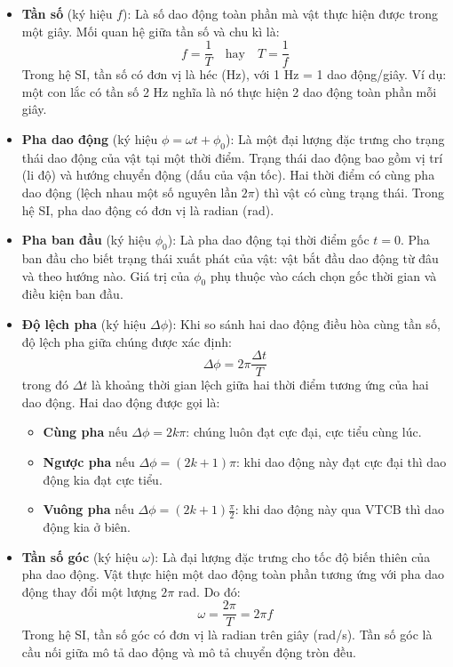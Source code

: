 \begin{enumerate}[label=\alph*)]
\begin{itemize}
        \item \textbf{Tần số} (ký hiệu $f$): Là số dao động toàn phần mà vật thực hiện được trong một giây. Mối quan hệ giữa tần số và chu kì là:
        \[
            f = \dfrac{1}{T} \quad \text{hay} \quad T = \dfrac{1}{f}
        \]
        Trong hệ SI, tần số có đơn vị là héc (Hz), với 1 Hz = 1 dao động/giây. Ví dụ: một con lắc có tần số 2 Hz nghĩa là nó thực hiện 2 dao động toàn phần mỗi giây.
        
        \item \textbf{Pha dao động} (ký hiệu $\phi = \omega t + \phi_0$): Là một đại lượng đặc trưng cho trạng thái dao động của vật tại một thời điểm. Trạng thái dao động bao gồm vị trí (li độ) và hướng chuyển động (dấu của vận tốc). Hai thời điểm có cùng pha dao động (lệch nhau một số nguyên lần $2\pi$) thì vật có cùng trạng thái. Trong hệ SI, pha dao động có đơn vị là radian (rad).
        
        \item \textbf{Pha ban đầu} (ký hiệu $\phi_0$): Là pha dao động tại thời điểm gốc $t = 0$. Pha ban đầu cho biết trạng thái xuất phát của vật: vật bắt đầu dao động từ đâu và theo hướng nào. Giá trị của $\phi_0$ phụ thuộc vào cách chọn gốc thời gian và điều kiện ban đầu.
        
        \item \textbf{Độ lệch pha} (ký hiệu $\Delta\phi$): Khi so sánh hai dao động điều hòa cùng tần số, độ lệch pha giữa chúng được xác định:
        \[
            \Delta \phi = 2\pi \dfrac{\Delta t}{T}
        \]
        trong đó $\Delta t$ là khoảng thời gian lệch giữa hai thời điểm tương ứng của hai dao động. Hai dao động được gọi là:
        \begin{itemize}
            \item \textbf{Cùng pha} nếu $\Delta\phi = 2k\pi$: chúng luôn đạt cực đại, cực tiểu cùng lúc.
            \item \textbf{Ngược pha} nếu $\Delta\phi = (2k+1)\pi$: khi dao động này đạt cực đại thì dao động kia đạt cực tiểu.
            \item \textbf{Vuông pha} nếu $\Delta\phi = (2k+1)\frac{\pi}{2}$: khi dao động này qua VTCB thì dao động kia ở biên.
        \end{itemize}
        
        \item \textbf{Tần số góc} (ký hiệu $\omega$): Là đại lượng đặc trưng cho tốc độ biến thiên của pha dao động. Vật thực hiện một dao động toàn phần tương ứng với pha dao động thay đổi một lượng $2\pi$ rad. Do đó:
        \[
            \omega = \dfrac{2\pi}{T} = 2\pi f
        \]
        Trong hệ SI, tần số góc có đơn vị là radian trên giây (rad/s). Tần số góc là cầu nối giữa mô tả dao động và mô tả chuyển động tròn đều.
    \end{itemize}


\end{enumerate}
